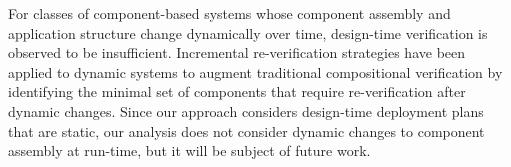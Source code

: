 For classes of component-based systems whose component assembly and application structure change dynamically over time, design-time verification is observed to be insufficient. Incremental re-verification strategies \cite{johnson2013} have been applied to dynamic systems to augment traditional compositional verification by identifying the minimal set of components that require re-verification after dynamic changes. Since our approach considers design-time deployment plans that are static, our analysis does not consider dynamic changes to component assembly at run-time, but it will be subject of future work. 